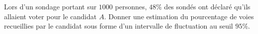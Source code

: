
\begin{exercice}\label{exosmath-0218}

Lors d'un sondage portant sur \( 1000\) personnes, \( 48\%\) des sondés ont déclaré qu'ils allaient voter pour le candidat $A$. Donner une estimation du pourcentage de voies recueillies par le candidat sous forme d'un intervalle de fluctuation au seuil \( 95\%\).

\end{exercice}
